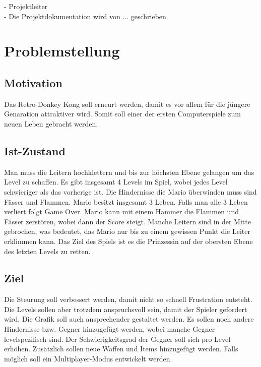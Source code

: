 \documentclass[12pt]{article}
\begin{document}
\maketitle

\newpage

\tableofcontents

\newpage

-  Projektleiter \\
- Die Projektdokumentation wird von ... geschrieben. \\

\newpage

\section{Problemstellung}

\subsection{Motivation}
Das Retro-Donkey Kong soll erneurt werden, damit es vor allem für die jüngere Genaration attraktiver wird.
Somit soll einer der ersten Computerspiele zum neuen Leben gebracht werden.

\subsection{Ist-Zustand}
Man muss die Leitern hochklettern und bis zur höchsten Ebene gelangen um das Level zu schaffen. Es gibt insgesamt
4 Levels im Spiel, wobei jedes Level schwieriger als das vorherige ist. Die Hindernisse die Mario überwinden muss sind Fässer und Flammen.
Mario besitzt insgesamt 3 Leben. Falls man alle 3 Leben verliert folgt Game Over. Mario kann mit einem Hammer die Flammen und Fässer 
zerstören, wobei dann der Score steigt. Manche Leitern sind in der Mitte gebrochen, was bedeutet, das Mario nur bis zu einem gewissen Punkt
die Leiter erklimmen kann. Das Ziel des Spiels ist es die Prinzessin auf der obersten Ebene des letzten Levels zu retten.

\subsection{Ziel}
Die Steurung soll verbessert werden, damit nicht so schnell Frustration entsteht. 
Die Levels sollen aber trotzdem anspruchsvoll sein, damit der Spieler gefordert wird. Die Grafik soll auch ansprechender gestaltet werden.
Es sollen noch andere Hindernisse bzw. Gegner hinzugefügt werden, wobei manche Gegner levelspezifisch sind. 
Der Schwierigkeitsgrad der Gegner soll sich pro Level erhöhen.
Zusätzlich sollen neue Waffen und Items hinzugefügt werden.
Falls möglich soll ein Multiplayer-Modus entwickelt werden.
\end{document}
